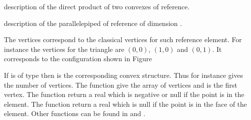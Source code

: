 \documentclass[a4paper,11pt,english]{sphinxmanual}
\begin{document}
\begin{fulllineitems}
\label{\detokenize{project/femdesc:_CPPv4N5bgeot18convex_ref_productE11pconvex_ref11pconvex_ref}}%
\pysigstartmultiline
{}%
\pysigstopmultiline
description of the direct product of two convexes of reference.

\end{fulllineitems}


\begin{fulllineitems}
\label{\detokenize{project/femdesc:_CPPv4N5bgeot27parallelepiped_of_referenceE8dim_type}}%
\pysigstartmultiline
{}%
\pysigstopmultiline
description of the parallelepiped of reference of dimension .

\end{fulllineitems}


The vertices correspond to the classical vertices for such reference element. For
instance the vertices for the triangle are \((0, 0)\), \((1, 0)\) and
\((0, 1)\). It corresponds to the configuration shown in Figure
{\hyperref[\detokenize{project/femdesc:dp-fig-elem}]{}}

If  is of type  then  is the corresponding convex
structure. Thus for instance  gives the number of
vertices. The function  give the array of vertices and
 is the first vertex. The function  return a real which is negative or null if the point  is in the
element. The function  return
a real which is null if the point  is in the face  of the element.
Other functions can be found in  and
.
\end{document}
